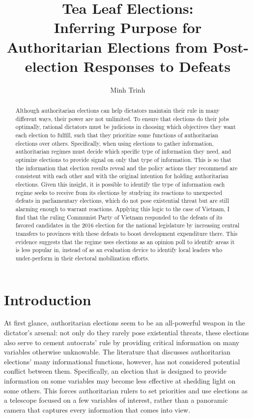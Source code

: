 \documentclass[12pt]{article}
\title{Tea Leaf Elections: \\
	Inferring Purpose for Authoritarian Elections from Post-election Responses to Defeats}
\author{Minh Trinh}
\newcommand{\1}{\mathbbm{1}}
\newcommand\wordcount{}
\begin{document}
	

\maketitle

\begin{abstract}
Although authoritarian elections can help dictators maintain their rule in many different ways, their power are not unlimited. To ensure that elections do their jobs optimally, rational dictators must be judicious in choosing which objectives they want each election to fulfill, such that they prioritize some functions of authoritarian elections over others. Specifically, when using elections to gather information, authoritarian regimes must decide which specific type of information they need, and optimize elections to provide signal on only that type of information. This is so that the information that election results reveal and the policy actions they recommend are consistent with each other and with the original intention for holding authoritarian elections. Given this insight, it is possible to identify the type of information each regime seeks to receive from its elections by studying its reactions to unexpected defeats in parliamentary elections, which do not pose existential threat but are still alarming enough to warrant reactions. Applying this logic to the case of Vietnam, I find that the ruling Communist Party of Vietnam responded to the defeats of its favored candidates in the 2016 election for the national legislature by increasing central transfers to provinces with these defeats to boost development expenditure there. This evidence suggests that the regime uses elections as an opinion poll to identify areas it is less popular in, instead of as an evaluation device to identify local leaders who under-perform in their electoral mobilization efforts.
\end{abstract}



\newpage
\doublespacing

\section{Introduction}

At first glance, authoritarian elections seem to be an all-powerful weapon in the dictator's arsenal: not only do they rarely pose existential threats, these elections also serve to cement autocrats' rule by providing critical information on many variables otherwise unknowable. The literature that discusses authoritarian elections' many informational functions, however, has not considered potential conflict between them. Specifically, an election that is designed to provide information on some variables may become less effective at shedding light on some others. This forces authoritarian rulers to set priorities and use elections as a telescope focused on a few variables of interest, rather than a panoramic camera that captures every information that comes into view.
\end{document}
